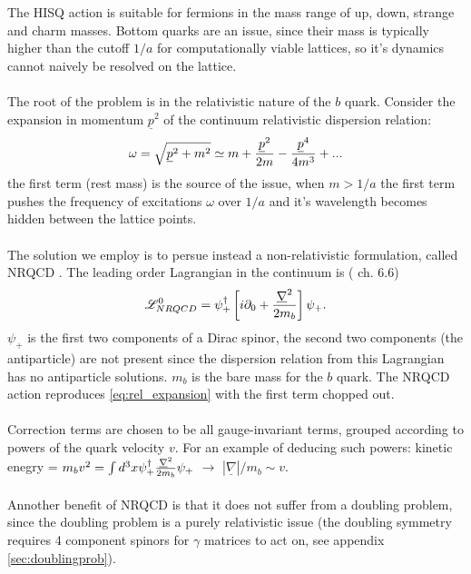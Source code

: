 The HISQ action is suitable for fermions in the mass range of up, down, strange and charm masses. Bottom quarks are an issue, since their mass is typically higher than the cutoff $1/a$ for computationally viable lattices, so it's dynamics cannot naively be resolved on the lattice.
\\ \\
The root of the problem is in the relativistic nature of the $b$ quark. Consider the expansion in momentum $\underline{p}^2$ of the continuum relativistic dispersion relation:
\begin{align}
	\omega = \sqrt{\underline{p}^2 + m^2} \simeq m + {\underline{p}^2\over 2m} - {\underline{p}^4\over 4m^3} + ...
	\label{eq:rel_expansion}
\end{align}
the first term (rest mass) is the source of the issue, when $m > 1/a$ the first term pushes the frequency of excitations $\omega$ over $1/a$ and it's wavelength becomes hidden between the lattice points. 
\\ \\
The solution we employ is to persue instead a non-relativistic formulation, called NRQCD \cite{Lepage:1992tx}. The leading order Lagrangian in the continuum is (\cite{DeGrand:2006zz} ch. 6.6)
\begin{align}
	\mathscr{L}^0_{NRQCD} = \psi^{\dagger}_+ \left[ i\partial_0 + {\underline{\nabla}^2\over 2m_b} \right] \psi_+.
\end{align}
$\psi_+$ is the first two components of a Dirac spinor, the second two components (the antiparticle) are not present since the dispersion relation from this Lagrangian has no antiparticle solutions.
$m_b$ is the bare mass for the $b$ quark. The NRQCD action reproduces \eqref{eq:rel_expansion} with the first term chopped out.
\\ \\
Correction terms are chosen to be all gauge-invariant terms, grouped according to powers of the quark velocity $v$. For an example of deducing such powers: 
kinetic enegry = $m_b v^2 = \int d^3x \psi_+^{\dagger} {\underline{\nabla}^2\over 2m_b} \psi_+$ $\rightarrow$ $|\underline{\nabla}|/m_b \sim v$.
\\ \\
Annother benefit of NRQCD is that it does not suffer from a doubling problem, since the doubling problem is a purely relativistic issue (the doubling symmetry requires 4 component spinors for $\gamma$ matrices to act on, see appendix \ref{sec:doublingprob}). 
\\ \\
